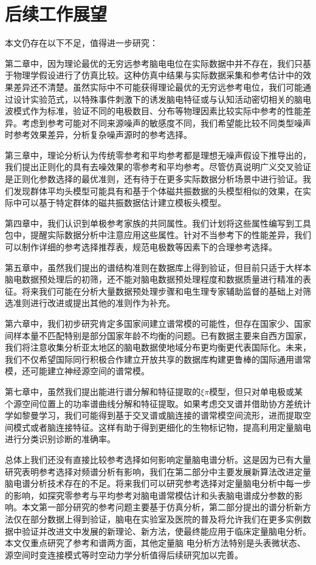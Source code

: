 \section{后续工作展望}
本文仍存在以下不足，值得进一步研究：

第二章中，因为理论最优的无穷远参考脑电电位在实际数据中并不存在，我们只基于物理学假设进行了仿真比较。这种仿真中结果与实际数据采集和参考估计中的效果差异还不清楚。虽然实际中不可能获得理论最优的无穷远参考电位，我们可能通过设计实验范式，以特殊事件刺激下的诱发脑电特征或与认知活动密切相关的脑电波模式作为标准，验证不同的电极数目、分布等物理因素比较实际中参考的性能差异。考虑到参考可能对不同来源噪声的敏感度不同，我们希望能比较不同类型噪声时参考效果差异，分析复杂噪声源时的参考选择。

第三章中，理论分析认为传统零参考和平均参考都是理想无噪声假设下推导出的，我们提出正则化的具有去噪效果的零参考和平均参考。尽管仿真说明广义交叉验证是正则化参数选择的最优准则，还有待于在更多实际数据分析场景中进行验证。我们发现群体平均头模型可能具有和基于个体磁共振数据的头模型相似的效果，在实际中可以基于特定群体的磁共振数据估计建立模板头模型。

第四章中，我们认识到单极参考家族的共同属性。我们计划将这些属性编写到工具包中，提醒实际数据分析中注意应用这些属性。针对不当参考下的性能差异，我们可以制作详细的参考选择推荐表，规范电极数等因素下的合理参考选择。

第五章中，虽然我们提出的谱结构准则在数据库上得到验证，但目前只适于大样本脑电数据预处理后的初筛，还不能对脑电数据预处理程度和数据质量进行精准的表征。将来我们可能在分析大量数据预处理步骤和电生理专家辅助监督的基础上对筛选准则进行改进或提出其他的准则作为补充。

第六章中，我们初步研究肯定多国家间建立谱常模的可能性，但存在国家少、国家间样本量不匹配特别是部分国家年龄不均衡的问题。已有数据主要来自西方国家，我们将注意收集分析亚太地区的脑电数据使地域分布更均衡更代表国际化。未来，我们不仅希望国际同行积极合作建立开放共享的数据库构建更鲁棒的国际通用谱常模，还可能建立神经源空间的谱常模。

第七章中，虽然我们提出能进行谱分解和特征提取的$\xi\pi$模型，但只对单电极或某个源空间位置上的功率谱曲线分解和特征提取。如果考虑交叉谱并借助协方差统计学如黎曼学习，我们可能得到基于交叉谱或脑连接的谱常模空间流形，进而提取空间模式或者脑连接特征。这样有助于得到更细化的生物标记物，提高利用定量脑电进行分类识别诊断的准确率。

总体上我们还没有直接比较参考选择如何影响定量脑电谱分析。这是因为已有大量研究表明参考选择对频谱分析有影响，我们在第二部分中主要发展新算法改进定量脑电谱分析技术存在的不足。将来我们可以研究参考选择对定量脑电分析中每一步的影响，如探究零参考与平均参考对脑电谱常模估计和头表脑电谱成分参数的影响。本文第一部分研究的参考问题主要基于仿真分析，第二部分提出的谱分析新方法仅在部分数据上得到验证，脑电在实验室及医院的普及将允许我们在更多实例数据中验证并改进文中发展的新理论、新方法，使最终能应用于临床定量脑电分析。本文仅重点研究了参考和谱两方面，其他定量脑
电分析方法特别是头表微状态、源空间时变连接模式等时空动力学分析值得后续研究加以完善。